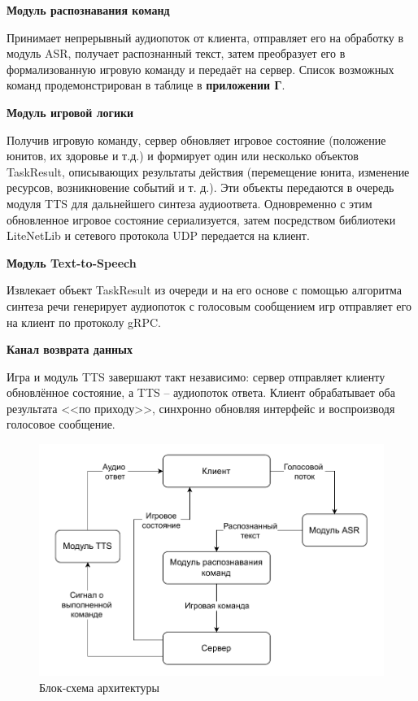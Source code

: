         \textbf{Модуль распознавания команд}
        
        Принимает непрерывный аудиопоток от клиента, отправляет его на обработку в модуль ASR, 
        получает распознанный текст, затем преобразует его в формализованную игровую команду и передаёт на сервер.
        Список возможных команд продемонстрирован в таблице в \textbf{приложении Г}.

        \textbf{Модуль игровой логики}

        Получив игровую команду, сервер обновляет игровое состояние (положение юнитов, их здоровье и т.д.) и формирует один или 
        несколько объектов TaskResult, описывающих результаты действия (перемещение юнита, изменение ресурсов, возникновение событий и т. д.).
        Эти объекты передаются в очередь модуля TTS для дальнейшего синтеза аудиоответа. Одновременно с этим обновленное игровое состояние
        сериализуется, затем посредством библиотеки LiteNetLib и сетевого протокола UDP передается на клиент.

        \textbf{Модуль Text-to-Speech}
        
        Извлекает объект TaskResult из очереди и на его основе с помощью алгоритма синтеза речи генерирует аудиопоток с голосовым сообщением игр
        отправляет его на клиент по протоколу gRPC.

        \textbf{Канал возврата данных}
        
        Игра и модуль TTS завершают такт независимо: сервер отправляет клиенту обновлённое состояние, а TTS -- аудиопоток ответа. 
        Клиент обрабатывает оба результата <<по приходу>>, синхронно обновляя интерфейс и воспроизводя голосовое сообщение.
        

        \begin{figure}[H]
            \centering
            \includegraphics[scale=1]{pictures/architecture_scheme.pdf}
            \caption{Блок-схема архитектуры}\label{ris1.1}
        \end{figure}

